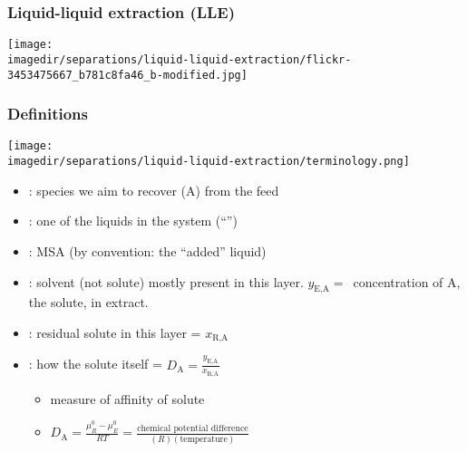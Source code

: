 \begin{frame}\frametitle{Liquid-liquid extraction (LLE)}
	\begin{center}
		\texttt{[image: \\imagedir/separations/liquid-liquid-extraction/flickr-3453475667\_b781c8fa46\_b-modified.jpg]}
	\end{center}
	\vspace{-12pt}
\end{frame}

\begin{frame}\frametitle{Definitions}
	\begin{center}
		\texttt{[image: \\imagedir/separations/liquid-liquid-extraction/terminology.png]}
	\end{center}
	
	\begin{itemize}
		\item	{\color{purple}{solute}}: species we aim to recover (A) from the feed 
		\item	{\color{purple}{feed or ``feed solvent''}}: one of the liquids in the system {\tiny (``{\color{purple}{carrier}}'')}
		\item	{\color{purple}{solvent}}: MSA (by convention: the ``added'' liquid)
		\item	{\color{purple}{extract}}: solvent (not solute) mostly present in this layer. $y_\text{E,A} =$~concentration of A, the solute, in extract.
		\item	{\color{purple}{raffinate}}: residual solute in this layer = $x_\text{R,A}$
		\item	{\color{purple}{distribution}}: how the solute {\color{purple}{partitions}} itself = $D_\text{A} = \displaystyle \frac{y_\text{E,A}}{x_\text{R,A}}$
			\begin{itemize}
				\item	measure of affinity of solute
				\item	$D_\text{A} = \displaystyle \frac{\mu_R^0 - \mu_E^0}{RT} = \displaystyle \frac{\text{chemical potential difference}}{(R)(\text{temperature})}$	%
			\end{itemize}
	\end{itemize}	
\end{frame}

